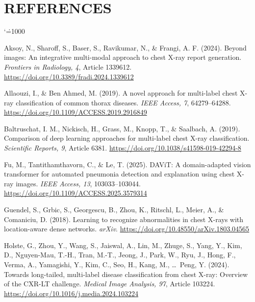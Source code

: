\documentclass[conference]{IEEEtran}
\begin{document}
\balance
\makeatletter
\renewenvironment{thebibliography}[1]{%
\section*{REFERENCES}\footnotesize\raggedright\sloppy
\list{}{\labelwidth\z@\leftmargin1.5em\itemindent-1.5em\labelsep\z@
\itemsep0pt\parsep0pt\listparindent0pt\topsep0pt}%
\def\@biblabel##1{}%
\def\newblock{\hskip .11em plus .33em minus .07em}\sfcode`\.=1000\relax}{\endlist}
\makeatother
\begin{thebibliography}{99}

Aksoy, N., Sharoff, S., Baser, S., Ravikumar, N., \& Frangi, A. F. (2024).
Beyond images: An integrative multi-modal approach to chest X-ray report generation.
\textit{Frontiers in Radiology, 4}, Article 1339612.
\url{https://doi.org/10.3389/fradi.2024.1339612}

Allaouzi, I., \& Ben Ahmed, M. (2019).
A novel approach for multi-label chest X-ray classification of common thorax diseases.
\textit{IEEE Access, 7}, 64279--64288.
\url{https://doi.org/10.1109/ACCESS.2019.2916849}

Baltruschat, I. M., Nickisch, H., Grass, M., Knopp, T., \& Saalbach, A. (2019).
Comparison of deep learning approaches for multi-label chest X-ray classification.
\textit{Scientific Reports, 9}, Article 6381.
\url{https://doi.org/10.1038/s41598-019-42294-8}

Fu, M., Tantithamthavorn, C., \& Le, T. (2025).
DAViT: A domain-adapted vision transformer for automated pneumonia detection and explanation using chest X-ray images.
\textit{IEEE Access, 13}, 103033--103044.
\url{https://doi.org/10.1109/ACCESS.2025.3579314}

Guendel, S., Grbic, S., Georgescu, B., Zhou, K., Ritschl, L., Meier, A., \& Comaniciu, D. (2018).
Learning to recognize abnormalities in chest X-rays with location-aware dense networks.
\textit{arXiv}. \url{https://doi.org/10.48550/arXiv.1803.04565}

Holste, G., Zhou, Y., Wang, S., Jaiswal, A., Lin, M., Zhuge, S., Yang, Y., Kim, D., Nguyen-Mau, T.-H., Tran, M.-T., Jeong, J., Park, W., Ryu, J., Hong, F., Verma, A., Yamagishi, Y., Kim, C., Seo, H., Kang, M., \ldots\ Peng, Y. (2024).
Towards long-tailed, multi-label disease classification from chest X-ray: Overview of the CXR-LT challenge.
\textit{Medical Image Analysis, 97}, Article 103224.
\url{https://doi.org/10.1016/j.media.2024.103224}


\end{thebibliography}
\end{document}
